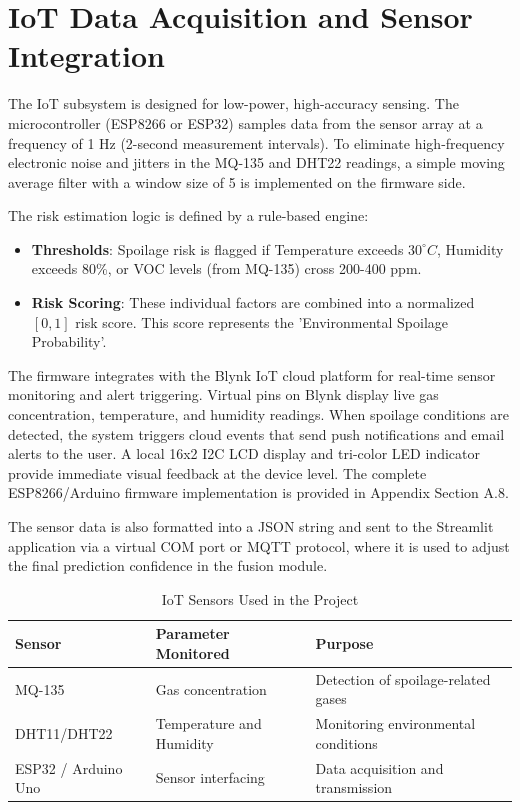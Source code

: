 \section[IoT Data Acquisition and Sensor Integration]{\textbf{IoT Data Acquisition and Sensor Integration}}
The IoT subsystem is designed for low-power, high-accuracy sensing. The microcontroller (ESP8266 or ESP32) samples data from the sensor array at a frequency of 1 Hz (2-second measurement intervals). To eliminate high-frequency electronic noise and jitters in the MQ-135 and DHT22 readings, a simple moving average filter with a window size of 5 is implemented on the firmware side.

The risk estimation logic is defined by a rule-based engine:
\begin{itemize}
    \item \textbf{Thresholds}: Spoilage risk is flagged if Temperature exceeds $30^{\circ}C$, Humidity exceeds 80\%, or VOC levels (from MQ-135) cross 200-400 ppm.
    \item \textbf{Risk Scoring}: These individual factors are combined into a normalized $[0, 1]$ risk score. This score represents the 'Environmental Spoilage Probability'.
\end{itemize}

The firmware integrates with the Blynk IoT cloud platform for real-time sensor monitoring and alert triggering. Virtual pins on Blynk display live gas concentration, temperature, and humidity readings. When spoilage conditions are detected, the system triggers cloud events that send push notifications and email alerts to the user. A local 16x2 I2C LCD display and tri-color LED indicator provide immediate visual feedback at the device level. The complete ESP8266/Arduino firmware implementation is provided in Appendix Section A.8.

The sensor data is also formatted into a JSON string and sent to the Streamlit application via a virtual COM port or MQTT protocol, where it is used to adjust the final prediction confidence in the fusion module.

\begin{table}[H]
	\centering
	\caption{IoT Sensors Used in the Project}
	\label{tab:iot_sensors}
	\begin{tabular}{|l|l|l|}
		\hline
		\textbf{Sensor} & \textbf{Parameter Monitored} & \textbf{Purpose} \\ \hline
		MQ-135 & Gas concentration & Detection of spoilage-related gases \\ \hline
		DHT11/DHT22 & Temperature and Humidity & Monitoring environmental conditions \\ \hline
		ESP32 / Arduino Uno & Sensor interfacing & Data acquisition and transmission \\ \hline
	\end{tabular}
\end{table}

